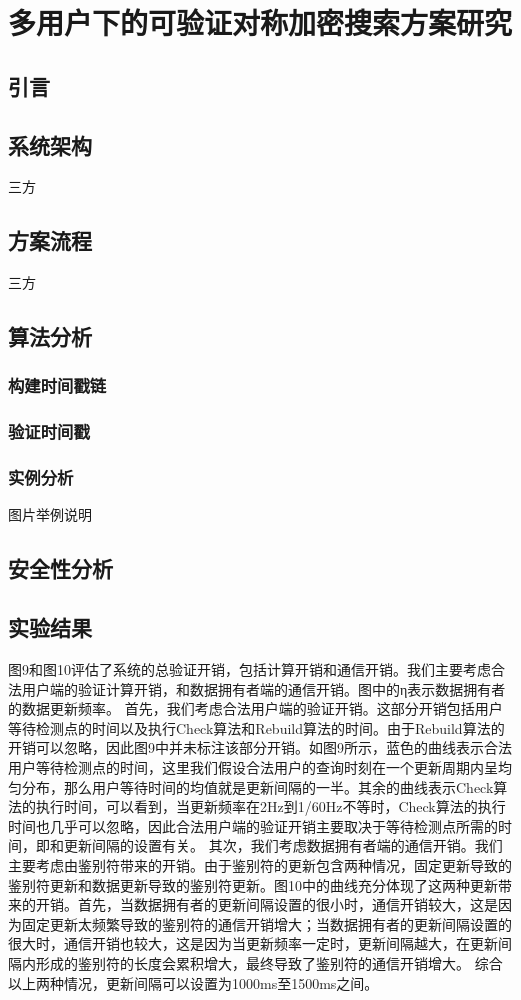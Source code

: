 \chapter{多用户下的可验证对称加密搜索方案研究}
\label{cha:multi-user}
\section{引言}

\section{系统架构} 三方

\section{方案流程} 三方

\section{算法分析}
\subsection{构建时间戳链}
\subsection{验证时间戳}
\subsection{实例分析} 图片举例说明

\section{安全性分析}

\section{实验结果}
图9和图10评估了系统的总验证开销，包括计算开销和通信开销。我们主要考虑合法用户端的验证计算开销，和数据拥有者端的通信开销。图中的η表示数据拥有者的数据更新频率。
首先，我们考虑合法用户端的验证开销。这部分开销包括用户等待检测点的时间以及执行Check算法和Rebuild算法的时间。由于Rebuild算法的开销可以忽略，因此图9中并未标注该部分开销。如图9所示，蓝色的曲线表示合法用户等待检测点的时间，这里我们假设合法用户的查询时刻在一个更新周期内呈均匀分布，那么用户等待时间的均值就是更新间隔的一半。其余的曲线表示Check算法的执行时间，可以看到，当更新频率在2Hz到1/60Hz不等时，Check算法的执行时间也几乎可以忽略，因此合法用户端的验证开销主要取决于等待检测点所需的时间，即和更新间隔的设置有关。
其次，我们考虑数据拥有者端的通信开销。我们主要考虑由鉴别符带来的开销。由于鉴别符的更新包含两种情况，固定更新导致的鉴别符更新和数据更新导致的鉴别符更新。图10中的曲线充分体现了这两种更新带来的开销。首先，当数据拥有者的更新间隔设置的很小时，通信开销较大，这是因为固定更新太频繁导致的鉴别符的通信开销增大；当数据拥有者的更新间隔设置的很大时，通信开销也较大，这是因为当更新频率一定时，更新间隔越大，在更新间隔内形成的鉴别符的长度会累积增大，最终导致了鉴别符的通信开销增大。
综合以上两种情况，更新间隔可以设置为1000ms至1500ms之间。
